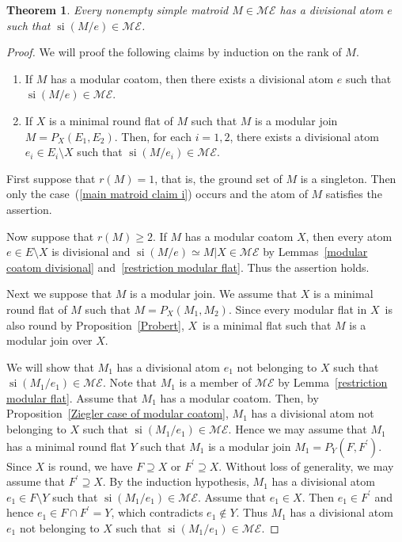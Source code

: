 \documentclass[pdftex]{sigma}
\numberwithin{equation}{section}
\newtheorem{Theorem}{Theorem}[section]
\DeclareMathOperator{\si}{si}
\begin{document}
\begin{Theorem}\label{main matroid}
Every nonempty simple matroid $ M \in \mathcal{ME} $ has a divisional atom $ e $ such that $ \si(M/e) \in \mathcal{ME} $.
\end{Theorem}
\begin{proof}
We will proof the following claims by induction on the rank of $ M $.
\begin{enumerate}[$(i)$]\itemsep=0pt
\item\label{main matroid claim i} If $ M $ has a modular coatom, then there exists a divisional atom $ e $ such that $ \si(M/e) \in \mathcal{ME} $.
\item\label{main matroid claim ii} If $ X $ is a minimal round flat of $ M $ such that $ M $ is a modular join $ M = P_{X}(E_{1}, E_{2}) $.
Then, for each $ i=1,2 $, there exists a divisional atom $ e_{i} \in E_{i}\setminus X $ such that $ \si(M/e_{i}) \in \mathcal{ME} $.
\end{enumerate}

First suppose that $ r(M) = 1 $, that is, the ground set of $ M $ is a singleton.
Then only the case~(\ref{main matroid claim i}) occurs and the atom of $ M $ satisfies the assertion.

Now suppose that $ r(M) \geq 2 $.
If $ M $ has a modular coatom $ X $, then every atom $ e \in E \setminus X $ is divisional and $ \si(M/e) \simeq M|X \in \mathcal{ME} $ by Lemmas~\ref{modular coatom divisional} and~\ref{restriction modular flat}. Thus the assertion holds.

Next we suppose that $ M $ is a modular join.
We assume that $ X $ is a minimal round flat of $ M $ such that $ M = P_{X}(M_{1},M_{2}) $.
Since every modular flat in $ X $~is also round by Proposition~\ref{Probert}, $ X $~is a minimal flat such that $ M $ is a modular join over $ X $.

We will show that $ M_{1} $ has a divisional atom $ e_{1} $ not belonging to $ X $ such that $ \si(M_{1}/e_{1}) \in \mathcal{ME} $.
Note that $ M_{1} $ is a member of $ \mathcal{ME} $ by Lemma~\ref{restriction modular flat}.
Assume that $ M_{1} $ has a modular coatom.
Then, by Proposition~\ref{Ziegler case of modular coatom}, $ M_{1} $ has a divisional atom not belonging to $ X $ such that $ \si(M_{1}/e_{1}) \in \mathcal{ME} $.
Hence we may assume that $ M_{1} $ has a minimal round flat $ Y $ such that $ M_{1} $ is a modular join $ M_{1} = P_{Y}(F,F^{\prime})$.
Since $ X $ is round, we have $ F \supseteq X $ or $ F^{\prime} \supseteq X $.
Without loss of generality, we may assume that $ F^{\prime} \supseteq X $.
By the induction hypothesis, $ M_{1} $ has a divisional atom $ e_{1} \in F\setminus Y $ such that $ \si(M_{1}/e_{1}) \in \mathcal{ME} $.
Assume that $ e_{1} \in X $.
Then $ e_{1} \in F^{\prime} $ and hence $ e_{1} \in F \cap F^{\prime} = Y $, which contradicts $ e_{1} \not\in Y $.
Thus $ M_{1} $ has a divisional atom $ e_{1} $ not belonging to $ X $ such that $ \si(M_{1}/e_{1}) \in \mathcal{ME} $.


\end{proof}
\end{document}
